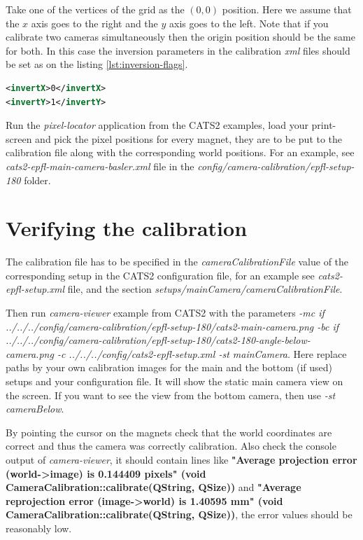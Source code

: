 \documentclass{styles/assisi}
\begin{document}
Take one of the vertices of the grid as the $(0,0)$ position. Here we assume that the $x$ axis goes to the right and the $y$ axis goes to the left. Note that if you calibrate two cameras simultaneously then the origin position should be the same for both. In this case the inversion parameters in the calibration {\it xml} files should be set as on the listing \ref{lst:inversion-flags}.

\begin{lstlisting}[caption={Axes invertion flags},label={lst:inversion-flags},language=xml]
<invertX>0</invertX>
<invertY>1</invertY>
\end{lstlisting}

Run the {\it pixel-locator} application from the CATS2 examples, load your print-screen and pick the pixel positions for every magnet, they are to be put to the calibration file along with the corresponding world positions. For an example, see {\it cats2-epfl-main-camera-basler.xml} file in the {\it config/camera-calibration/epfl-setup-180} folder. 

\section{Verifying the calibration}
The calibration file has to be specified in the {\it cameraCalibrationFile} value of the corresponding setup in the CATS2 configuration file, for an example see {\it cats2-epfl-setup.xml} file, and the section {\it setups/mainCamera/cameraCalibrationFile}. 

Then run {\it camera-viewer} example from CATS2 with the parameters 
{\it -mc if ../../../config/camera-calibration/epfl-setup-180/cats2-main-camera.png -bc if ../../../config/camera-calibration/epfl-setup-180/cats2-180-angle-below-camera.png  -c ../../../config/cats2-epfl-setup.xml -st mainCamera}. Here replace paths by your own calibration images for the main and the bottom (if used) setups and your configuration file. It will show the static main camera view on the screen. If you want to see the view from the bottom camera, then use {\it -st cameraBelow}. 

By pointing the cursor on the magnets check that the world coordinates are correct and thus the camera was correctly calibration. Also check the console output of {\it camera-viewer}, it should contain lines like {\bf "Average projection error (world->image) is 0.144409 pixels" (void CameraCalibration::calibrate(QString, QSize))} and {\bf "Average reprojection error (image->world) is 1.40595 mm" (void CameraCalibration::calibrate(QString, QSize))}, the error values should be reasonably low. 
\end{document}
